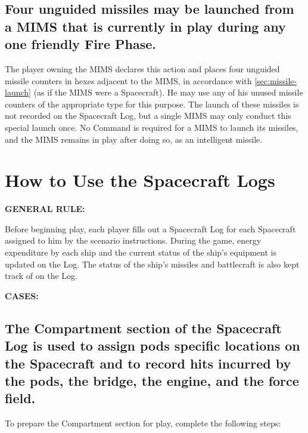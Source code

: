 \subsection[MIMS Launching Of Missiles]{Four unguided missiles may be
  launched from a MIMS that is currently in play during any one
  friendly Fire  
  Phase.}
\label{sec:mims-launch}



The player owning the MIMS declares this action and places four
unguided missile counters in hexes adjacent to the MIMS, in accordance
with \ref{sec:missile-launch} (as if the MIMS were a Spacecraft). He
may use any of his unused missile counters of the appropriate type for
this purpose. The launch of these missiles is not recorded on the
Spacecraft Log, but a single MIMS may only conduct this special launch
once. No Command is required for a MIMS to launch its missiles, and
the MIMS remains in play after doing so, as an intelligent missile.


\section{How to Use the Spacecraft Logs}
\label{sec:how-use-spacecraft-logs}

\noindent\textbf{GENERAL RULE:}

Before beginning play, each player fills out a Spacecraft Log for each
Spacecraft assigned to him by the scenario instructions. During the
game, energy expenditure by each ship and the current status of the
ship's equipment is updated on the Log. The status of the ship's
missiles and battlecraft is also kept track of on the Log.

\medskip

\noindent\textbf{CASES:} 

\subsection[Compartments Section]{The Compartment section of
  the Spacecraft 
  Log is used to 
  assign pods specific locations on the  
  Spacecraft and to record hits incurred by the pods, the bridge, the 
  engine, and the force field.}
\label{sec:compartment-section}



To prepare the Compartment section for play, complete the following steps: 

